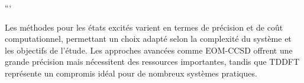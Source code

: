\documentclass[12pt,a4paper]{report}
\numberwithin{equation}{section}
\numberwithin{figure}{section}
\numberwithin{table}{section}
\begin{document}
\begin{markdown}
```

Les méthodes pour les états excités varient en termes de précision et de coût computationnel, permettant un choix adapté selon la complexité du système et les objectifs de l'étude. Les approches avancées comme EOM-CCSD offrent une grande précision mais nécessitent des ressources importantes, tandis que TDDFT représente un compromis idéal pour de nombreux systèmes pratiques.

\end{markdown}
\end{document}
